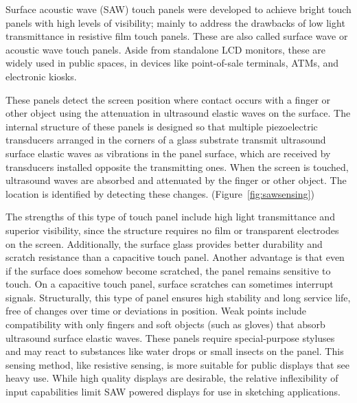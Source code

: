 Surface acoustic wave (SAW) touch panels were developed to achieve bright touch panels with high levels of visibility; mainly to address the drawbacks of low light transmittance in resistive film touch panels. 
These are also called surface wave or acoustic wave touch panels. 
Aside from standalone LCD monitors, these are widely used in public spaces, in devices like point-of-sale terminals, ATMs, and electronic kiosks.

These panels detect the screen position where contact occurs with a finger or other object using the attenuation in ultrasound elastic waves on the surface. 
The internal structure of these panels is designed so that multiple piezoelectric transducers arranged in the corners of a glass substrate transmit ultrasound surface elastic waves as vibrations in the panel surface, which are received by transducers installed opposite the transmitting ones. 
When the screen is touched, ultrasound waves are absorbed and attenuated by the finger or other object. 
The location is identified by detecting these changes.
(Figure~\ref{fig:sawsensing})



The strengths of this type of touch panel include high light transmittance and superior visibility, since the structure requires no film or transparent electrodes on the screen. 
Additionally, the surface glass provides better durability and scratch resistance than a capacitive touch panel. 
Another advantage is that even if the surface does somehow become scratched, the panel remains sensitive to touch. 
On a capacitive touch panel, surface scratches can sometimes interrupt signals. 
Structurally, this type of panel ensures high stability and long service life, free of changes over time or deviations in position.
Weak points include compatibility with only fingers and soft objects (such as gloves) that absorb ultrasound surface elastic waves. 
These panels require special-purpose styluses and may react to substances like water drops or small insects on the panel.
This sensing method, like resistive sensing, is more suitable for public displays that see heavy use.
While high quality displays are desirable, the relative inflexibility of input capabilities limit SAW powered displays for use in sketching applications.



